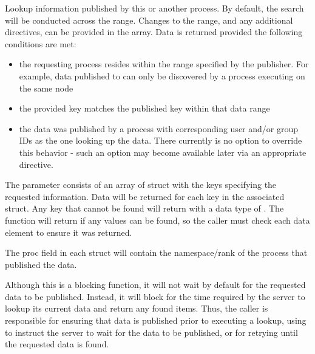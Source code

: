 
\optattrend

\descr

Lookup information published by this or another process.
By default, the search will be conducted across the  range.
Changes to the range, and any additional directives, can be provided in the  array. Data is returned provided the following conditions are met:

\begin{itemize}
    \item the requesting process resides within the range specified by the publisher. For example, data published to  can only be discovered by a process executing on the same node
    \item the provided key matches the published key within that data range
    \item the data was published by a process with corresponding user and/or group IDs as the one looking up the data. There currently is no option to override this behavior - such an option may become available later via an appropriate  directive.
\end{itemize}

The  parameter consists of an array of  struct with the keys specifying the requested information.
Data will be returned for each key in the associated  struct.
Any key that cannot be found will return with a data type of .
The function will return  if any values can be found, so the caller must check each data element to ensure it was returned.

The proc field in each  struct will contain the namespace/rank of the process that published the data.

\adviceuserstart
Although this is a blocking function, it will not wait by default for the requested data to be published.
Instead, it will block for the time required by the server to lookup its current data and return any found items.
Thus, the caller is responsible for ensuring that data is published prior to executing a lookup, using  to instruct the server to wait for the data to be published, or for retrying until the requested data is found.
\adviceuserend

